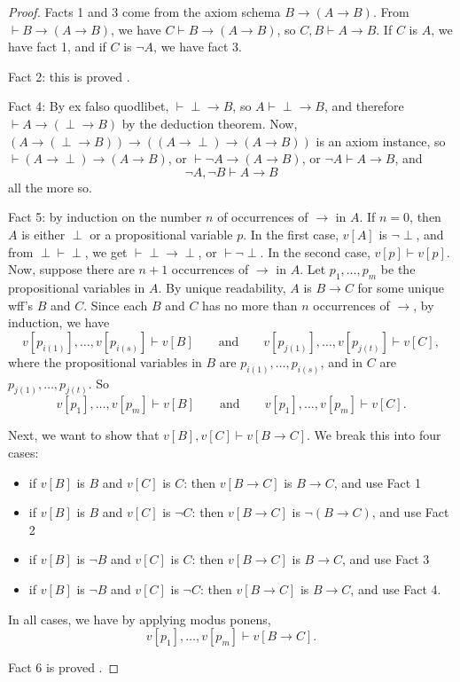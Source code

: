 \documentclass[12pt]{article}
\begin{document}
\begin{proof}
Facts 1 and 3 come from the axiom schema $B\to (A\to B)$.  From $\vdash B\to (A\to B)$, we have $C\vdash B\to (A\to B)$, so $C,B \vdash A\to B$.  If $C$ is $A$, we have fact 1, and if $C$ is $\neg A$, we have fact 3.

Fact 2: this is proved .

Fact 4: By ex falso quodlibet, $\vdash \perp \to B$, so $A\vdash \perp\to B$, and therefore $\vdash A\to (\perp\to B)$ by the deduction theorem.  Now, $(A \to (\perp \to B))\to ((A\to \perp)\to (A\to B))$ is an axiom instance, so $\vdash (A\to \perp) \to (A\to B)$, or $\vdash \neg A \to (A\to B)$, or $\neg A \vdash A\to B$, and $$ \neg A, \neg B \vdash A\to B$$ all the more so.

Fact 5: by induction on the number $n$ of occurrences of $\to$ in $A$.  If $n=0$, then $A$ is either $\perp$ or a propositional variable $p$.  In the first case, $v[A]$ is $\neg \perp$, and from $\perp \vdash \perp$, we get $\vdash \perp \to \perp$, or $\vdash \neg \perp$.  In the second case, $v[p]\vdash v[p]$.  Now, suppose there are $n+1$ occurrences of $\to$ in $A$.  Let $p_1,\ldots, p_m$ be the propositional variables in $A$.  By unique readability, $A$ is $B\to C$ for some unique wff's $B$ and $C$.  Since each $B$ and $C$ has no more than $n$ occurrences of $\to$, by induction, we have 
$$v[p_{i(1)}],\ldots, v[p_{i(s)}] \vdash v[B] \qquad \mbox{and} \qquad v[p_{j(1)}],\ldots,  v[p_{j(t)}] \vdash v[C],$$
where the propositional variables in $B$ are $p_{i(1)},\ldots,p_{i(s)}$, and in $C$ are $p_{j(1)},\ldots,p_{j(t)}$.  So
$$v[p_1],\ldots, v[p_m] \vdash v[B] \qquad \mbox{and} \qquad v[p_1],\ldots,  v[p_m] \vdash v[C].$$

Next, we want to show that $v[B],v[C] \vdash v[B\to C]$.  We break this into four cases:
\begin{itemize}
\item if $v[B]$ is $B$ and $v[C]$ is $C$: then $v[B\to C]$ is $B\to C$, and use Fact 1
\item if $v[B]$ is $B$ and $v[C]$ is $\neg C$: then $v[B\to C]$ is $\neg (B\to C)$, and use Fact 2
\item if $v[B]$ is $\neg B$ and $v[C]$ is $C$: then $v[B\to C]$ is $B\to C$, and use Fact 3
\item if $v[B]$ is $\neg B$ and $v[C]$ is $\neg C$: then $v[B\to C]$ is $B\to C$, and use Fact 4.
\end{itemize}
In all cases, we have by applying modus ponens,
$$v[p_1],\ldots, v[p_m] \vdash v[B \to C].$$

Fact 6 is proved .
\end{proof}
\end{document}
